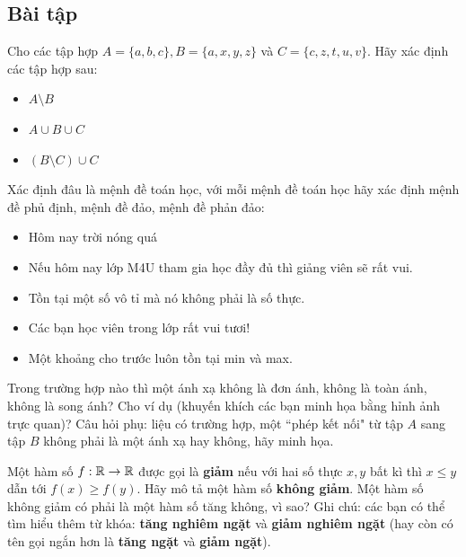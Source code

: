 \subsection{Bài tập}

\begin{exercise}
    Cho các tập hợp $A = \{a, b, c\}, B = \{a, x, y, z\}$ và $C = \{c, z, t, u, v\}$. Hãy xác định các tập hợp sau:
    \begin{itemize}
        \item $A \setminus B$
        \item $A \cup B \cup C$
        \item $(B \setminus C) \cup C$
    \end{itemize}
\end{exercise}

\begin{exercise}
    Xác định đâu là mệnh đề toán học, với mỗi mệnh đề toán học hãy xác định mệnh đề phủ định, mệnh đề đảo, mệnh đề phản đảo:
    \begin{itemize}
        \item Hôm nay trời nóng quá
        \item Nếu hôm nay lớp M4U tham gia học đầy đủ thì giảng viên sẽ rất vui.
        \item Tồn tại một số vô tỉ mà nó không phải là số thực.
        \item Các bạn học viên trong lớp rất vui tươi!
        \item Một khoảng cho trước luôn tồn tại min và max.
    \end{itemize}
\end{exercise}

\begin{exercise}
    Trong trường hợp nào thì một ánh xạ không là đơn ánh, không là toàn ánh, không là song ánh? Cho ví dụ (khuyến khích các bạn minh họa bằng hỉnh ảnh trực quan)? Câu hỏi phụ: liệu có trường hợp, một ``phép kết nối" từ tập $A$ sang tập $B$ không phải là một ánh xạ hay không, hãy minh họa.
\end{exercise}

\begin{exercise} %
    Một hàm số $f: \mathbb{R} \to \mathbb{R}$ được gọi là \textbf{giảm} nếu với hai số thực $x, y$ bất kì thì $x \le y$ dẫn tới $f(x) \ge f(y)$. Hãy mô tả một hàm số \textbf{không giảm}. Một hàm số không giảm có phải là một hàm số tăng không, vì sao?
    Ghi chú: các bạn có thể tìm hiểu thêm từ khóa: \textbf{tăng nghiêm ngặt} và \textbf{giảm nghiêm ngặt} (hay còn có tên gọi ngắn hơn là \textbf{tăng ngặt} và \textbf{giảm ngặt}).
\end{exercise}

